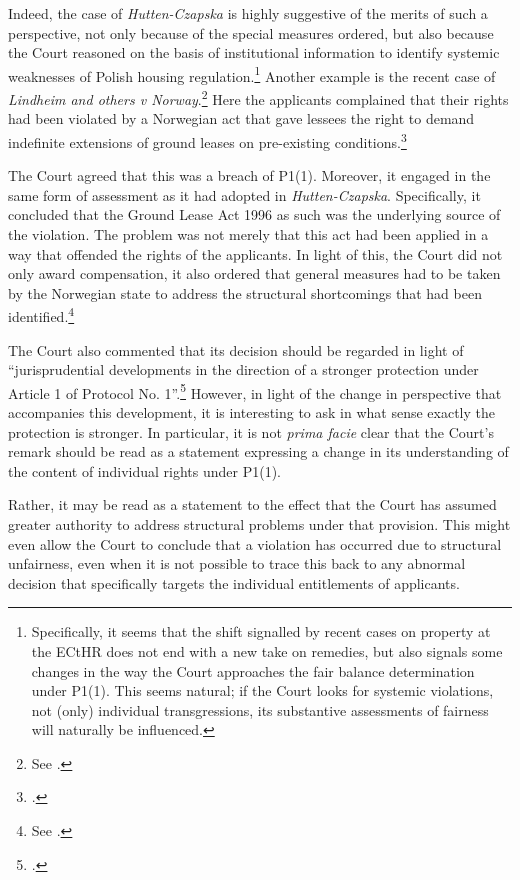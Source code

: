 Indeed, the case of {\it Hutten-Czapska} is highly suggestive of the merits of such a perspective, not only because of the special measures ordered, but also because the Court reasoned on the basis of institutional information to identify systemic weaknesses of Polish housing regulation.\footnote{Specifically, it seems that the shift signalled by recent cases on property at the ECtHR does not end with a new take on remedies, but also signals some changes in the way the Court approaches the fair balance determination under P1(1). This seems natural; if the Court looks for systemic violations, not (only) individual transgressions, its substantive assessments of fairness will naturally be influenced.} Another example is the recent case of {\it Lindheim and others v Norway}.\footnote{See \cite{lindheim12}.} Here the applicants complained that their rights had been violated by a Norwegian act that gave lessees the right to demand indefinite extensions of ground leases on pre-existing conditions.\footcite[119]{lindheim12}

The Court agreed that this was a breach of P1(1). Moreover, it engaged in the same form of assessment as it had adopted in {\it Hutten-Czapska}. Specifically, it concluded that the Ground Lease Act 1996 as such was the underlying source of the violation. The problem was not merely that this act had been applied in a way that offended the rights of the applicants. In light of this, the Court did not only award compensation, it also ordered that general measures had to be taken by the Norwegian state to address the structural shortcomings that had been identified.\footnote{See \cite{lindheim12}.}

The Court also commented that its decision should be regarded in light of ``jurisprudential developments in the direction of a stronger protection under Article 1 of Protocol No. 1''.\footcite[135]{lindheim12} However, in light of the change in perspective that accompanies this development, it is interesting to ask in what sense exactly the protection is stronger. In particular, it is not {\it prima facie} clear that the Court's remark should be read as a statement expressing a change in its understanding of the content of individual rights under P1(1). 

Rather, it may be read as a statement to the effect that the Court has assumed greater authority to address structural problems under that provision. This might even allow the Court to conclude that a violation has occurred due to structural unfairness, even when it is not possible to trace this back to any abnormal decision that specifically targets the individual entitlements of applicants.

